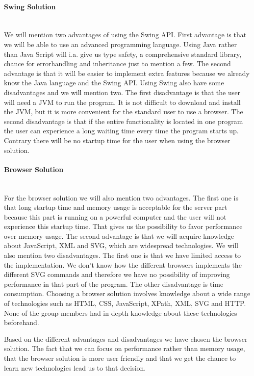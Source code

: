 \documentclass[a4paper,10pt,titlepage]{article}
\begin{document}
\paragraph{Swing Solution}\mbox{}\\
We will mention two advantages of using the Swing API. First advantage is that we will be able to use an advanced programming language. Using Java rather than Java Script will i.a. give us type safety, a comprehensive standard library, chance for errorhandling and inheritance just to mention a few. The second advantage is that it will be easier to implement extra features because we already know the Java language and the Swing API. Using Swing also have some disadvantages and we will mention two. The first disadvantage is that the user will need a JVM to run the program. It is not difficult to download and install the JVM, but it is more convenient for the standard user to use a browser. The second disadvantage is that if the entire functionality is located in one program the user can experience a long waiting time every time the program starts up. Contrary there will be no startup time for the user when using the browser solution. 

\paragraph{Browser Solution}\mbox{}\\
For the browser solution we will also mention two advantages. The first one is that long startup time and memory usage is acceptable for the server part because this part is running on a powerful computer and the user will not experience this startup time. That gives us the possibility to favor performance over memory usage. The second advantage is that we will acquire knowledge about JavaScript, XML and SVG, which are widespread technologies. We will also mention two disadvantages. The first one is that we have limited access to the implementation. We don't know how the different browsers implements the different SVG commands and therefore we have no possibility of improving performance in that part of the program. The other disadvantage is time consumption. Choosing a browser solution involves knowledge about a wide range of technologies such as HTML, CSS, JavaScript, XPath, XML, SVG and HTTP. None of the group members had in depth knowledge about these technologies beforehand. 

Based on the different advantages and disadvantages we have chosen the browser solution. The fact that we can focus on performance rather than memory usage, that the browser solution is more user friendly and that we get the chance to learn new technologies lead us to that decision.
\end{document}
